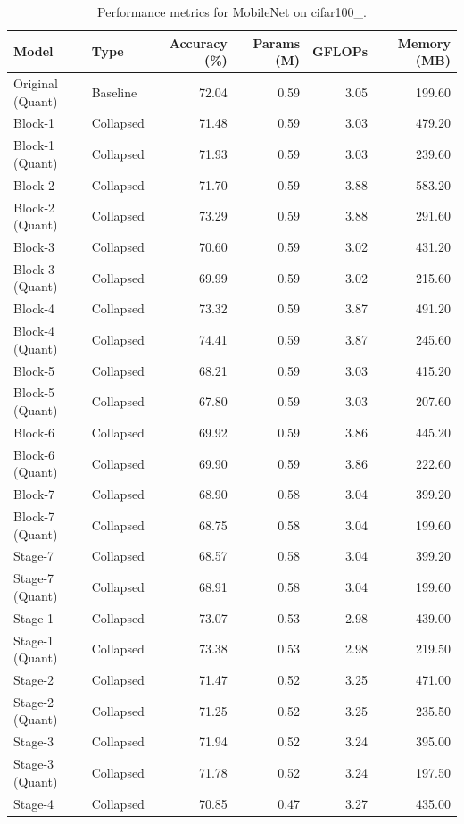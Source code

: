 \begin{table}
\caption{Performance metrics for MobileNet on cifar100_.}
\label{tab:MobileNet_cifar100_}
\begin{tabular}{llrrrr}
\toprule
Model & Type & Accuracy (\%) & Params (M) & GFLOPs & Memory (MB) \\
\midrule
Original
(Quant) & Baseline & 72.04 & 0.59 & 3.05 & 199.60 \\
Block-1 & Collapsed & 71.48 & 0.59 & 3.03 & 479.20 \\
Block-1
(Quant) & Collapsed & 71.93 & 0.59 & 3.03 & 239.60 \\
Block-2 & Collapsed & 71.70 & 0.59 & 3.88 & 583.20 \\
Block-2
(Quant) & Collapsed & 73.29 & 0.59 & 3.88 & 291.60 \\
Block-3 & Collapsed & 70.60 & 0.59 & 3.02 & 431.20 \\
Block-3
(Quant) & Collapsed & 69.99 & 0.59 & 3.02 & 215.60 \\
Block-4 & Collapsed & 73.32 & 0.59 & 3.87 & 491.20 \\
Block-4
(Quant) & Collapsed & 74.41 & 0.59 & 3.87 & 245.60 \\
Block-5 & Collapsed & 68.21 & 0.59 & 3.03 & 415.20 \\
Block-5
(Quant) & Collapsed & 67.80 & 0.59 & 3.03 & 207.60 \\
Block-6 & Collapsed & 69.92 & 0.59 & 3.86 & 445.20 \\
Block-6
(Quant) & Collapsed & 69.90 & 0.59 & 3.86 & 222.60 \\
Block-7 & Collapsed & 68.90 & 0.58 & 3.04 & 399.20 \\
Block-7
(Quant) & Collapsed & 68.75 & 0.58 & 3.04 & 199.60 \\
Stage-7 & Collapsed & 68.57 & 0.58 & 3.04 & 399.20 \\
Stage-7
(Quant) & Collapsed & 68.91 & 0.58 & 3.04 & 199.60 \\
Stage-1 & Collapsed & 73.07 & 0.53 & 2.98 & 439.00 \\
Stage-1
(Quant) & Collapsed & 73.38 & 0.53 & 2.98 & 219.50 \\
Stage-2 & Collapsed & 71.47 & 0.52 & 3.25 & 471.00 \\
Stage-2
(Quant) & Collapsed & 71.25 & 0.52 & 3.25 & 235.50 \\
Stage-3 & Collapsed & 71.94 & 0.52 & 3.24 & 395.00 \\
Stage-3
(Quant) & Collapsed & 71.78 & 0.52 & 3.24 & 197.50 \\
Stage-4 & Collapsed & 70.85 & 0.47 & 3.27 & 435.00 \\

\end{tabular}
\end{table}

